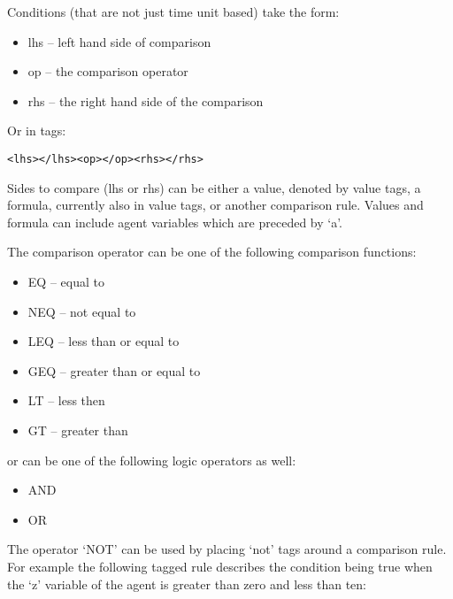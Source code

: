 Conditions (that are not just time unit based) take the form:

\begin{itemize}
  \item lhs -- left hand side of comparison
  \item op -- the comparison operator
  \item rhs -- the right hand side of the comparison
\end{itemize}

Or in tags:

\begin{mylisting}
\begin{verbatim}
<lhs></lhs><op></op><rhs></rhs>
\end{verbatim}
\end{mylisting}

Sides to compare (lhs or rhs) can be either a value, denoted by value tags, 
a formula, currently also in value tags, or another comparison rule.
Values and formula can include agent variables which are preceded by `a'.


The comparison operator can be one of the following comparison functions:

\begin{itemize}
\item EQ -- equal to
\item NEQ -- not equal to
\item LEQ -- less than or equal to
\item GEQ -- greater than or equal to
\item LT -- less then
\item GT -- greater than
\end{itemize}

or can be one of the following logic operators as well:

\begin{itemize}
\item AND
\item OR
\end{itemize}

The operator `NOT' can be used by placing `not' tags around a comparison rule.
For example the following tagged rule describes the condition being true when
the `z' variable of the agent is greater than zero and less than ten:

